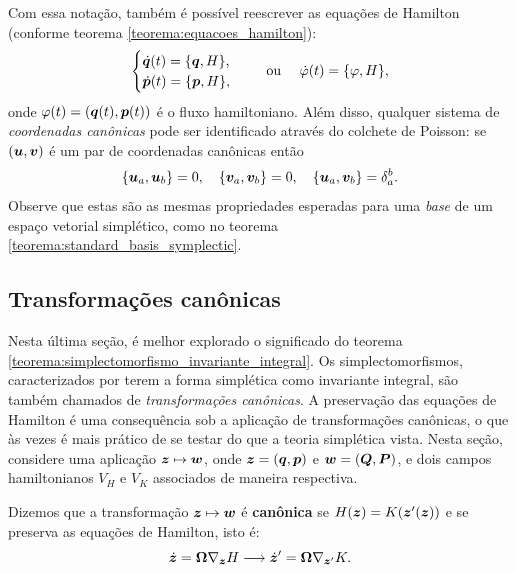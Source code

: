 Com essa notação, também é possível reescrever as equações de Hamilton (conforme teorema \ref{teorema:equacoes_hamilton}):
\begin{equation}\label{eq:poisson_hamilton_equacoes}
    \begin{cases}
        \dot {\bm q}(t) = \{\bm q, H\}, \\
        \dot {\bm p}(t) = \{\bm p, H\},
    \end{cases}
    \quad \text{ ou } \quad
    \dot \varphi(t) = \{\varphi, H\},
\end{equation}
onde $\varphi(t) = (\bm q(t), \bm p(t))$ é o fluxo hamiltoniano. Além disso, qualquer sistema de \textit{coordenadas canônicas} pode ser identificado através do colchete de Poisson: se $(\bm u, \bm v)$ é um par de coordenadas canônicas então
\begin{equation}\label{eq:poisson_coordenadas_canonicas}
    \{\bm u_a, \bm u_b \} = 0,
    \quad
    \{\bm v_a, \bm v_b \} = 0,
    \quad
    \{\bm u_a, \bm v_b \} = \delta_a^b.
\end{equation}
Observe que estas são as mesmas propriedades esperadas para uma \textit{base} de um espaço vetorial simplético, como no teorema \ref{teorema:standard_basis_symplectic}.

\subsection{Transformações canônicas}
Nesta última seção, é melhor explorado o significado do teorema \ref{teorema:simplectomorfismo_invariante_integral}. Os simplectomorfismos, caracterizados por terem a forma simplética como invariante integral, são também chamados de \textit{transformações canônicas}. A preservação das equações de Hamilton é uma consequência sob a aplicação de transformações canônicas, o que às vezes é mais prático de se testar do que a teoria simplética vista. Nesta seção, considere uma aplicação $\bm z \mapsto \bm w$, onde $\bm z = (\bm q, \bm p)$ e $\bm w = (\bm Q, \bm P)$, e dois campos hamiltonianos $V_H$ e $V_K$ associados de maneira respectiva.

\begin{definition}
    Dizemos que a transformação $\bm z \mapsto \bm w$ é \textbf{canônica} se $H(\bm z) = K(\bm z'(\bm z))$ e se preserva as equações de Hamilton, isto é:
    \begin{equation*}
        \dot {\bm z} = \bm \Omega \nabla_{\bm z} H
        \longrightarrow
        \dot {\bm z}' = \bm \Omega \nabla_{\bm z'} K.
    \end{equation*}
\end{definition}

